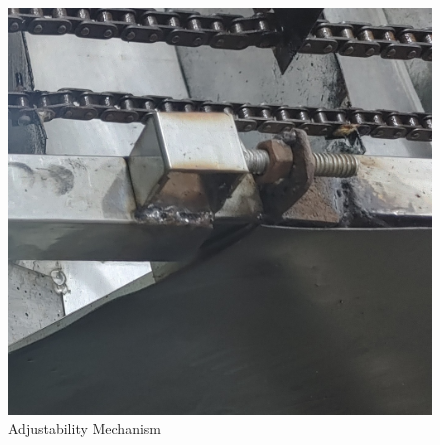 \begin{figure}[H]
\begin{minipage}{0.50\textwidth}
      \includegraphics[width=1\textwidth]{Adjustability Mechanism.jpg}
    \end{minipage}
    \caption{Adjustability Mechanism}
\end{figure}
